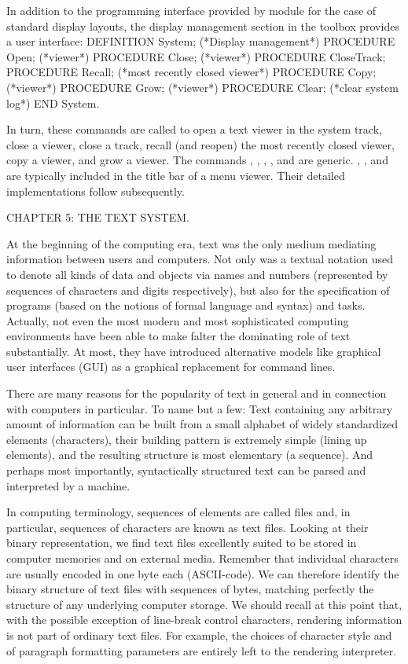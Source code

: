 In addition to the programming interface provided by module  for
the case of standard display layouts, the display management section
in the  toolbox provides a user interface:
\begintt
DEFINITION System; (*Display management*)
  PROCEDURE Open; (*viewer*)
  PROCEDURE Close; (*viewer*)
  PROCEDURE CloseTrack;
  PROCEDURE Recall; (*most recently closed viewer*)
  PROCEDURE Copy; (*viewer*)
  PROCEDURE Grow; (*viewer*)
  PROCEDURE Clear; (*clear system log*)
END System.
\endtt

\noindent In turn, these commands are called to open a text viewer in
the system track, close a viewer, close a track, recall (and reopen)
the most recently closed viewer, copy a viewer, and grow a viewer. The
commands , , , ,
and  are generic. , ,
and  are typically included in the title bar of a menu
viewer. Their detailed implementations follow subsequently.

\beginchapter CHAPTER 5: THE TEXT SYSTEM.

At the beginning of the computing era, text was the only medium
mediating information between users and computers. Not only was a
textual notation used to denote all kinds of data and objects via
names and numbers (represented by sequences of characters and digits
respectively), but also for the specification of programs (based on
the notions of formal language and syntax) and tasks. Actually, not
even the most modern and most sophisticated computing environments
have been able to make falter the dominating role of text
substantially. At most, they have introduced alternative models like
graphical user interfaces (GUI) as a graphical replacement for command
lines.

There are many reasons for the popularity of text in general and in
connection with computers in particular. To name but a few: Text
containing any arbitrary amount of information can be built from a
small alphabet of widely standardized elements (characters), their
building pattern is extremely simple (lining up elements), and the
resulting structure is most elementary (a sequence). And perhaps most
importantly, syntactically structured text can be parsed and
interpreted by a machine.

In computing terminology, sequences of elements are called files and,
in particular, sequences of characters are known as text
files. Looking at their binary representation, we find text files
excellently suited to be stored in computer memories and on external
media. Remember that individual characters are usually encoded in one
byte each (ASCII-code). We can therefore identify the binary structure
of text files with sequences of bytes, matching perfectly the
structure of any underlying computer storage. We should recall at this
point that, with the possible exception of line-break control
characters, rendering information is not part of ordinary text
files. For example, the choices of character style and of paragraph
formatting parameters are entirely left to the rendering interpreter.

